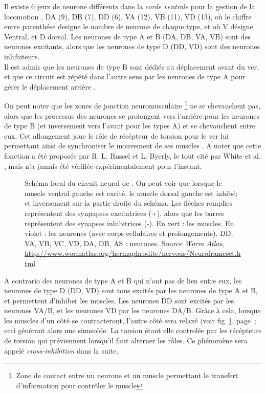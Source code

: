 Il existe 6 jeux de neurone différents dans la \textit{corde ventrale} pour la
gestion de la locomotion \cite{Boyle2009}, DA (9), DB (7), DD (6), VA (12), VB
(11), VD (13), où le chiffre entre parenthése designe le nombre de neurone de
chaque type, et où V désigne Ventral, et D dorsal.  Les neurones de type A et B
(DA, DB, VA, VB) sont des neurones excitants, alors que les neurones de type D
(DD, VD) sont des neurones inhibiteurs.\\


Il est admis que les neurones de type B sont dédiés au déplacement avant du ver,
et que ce circuit est répété dans l'autre sens par les neurones de type A
pour gérer le déplacement arrière \cite{AltunZ.F.andHall2011,Boyle2009,White1986}.

On peut noter que les zones de jonction neuromusculaire \footnote{Zone de
contact entre un neurone et un muscle permettant le transfert d'information 
pour contrôler le muscle} ne se chevauchent pas, alors que les processus
des neurones se prolongent vers l'arrière pour les neurones de type B (et
inversement vers l'avant pour les types A) et se chevauchent entre eux. Cet
allongement joue le rôle de récépteur de torsion pour le ver lui permettant
ainsi de synchroniser le mouvement de ses muscles \cite{Boyle2009}. A noter que
cette fonction a été proposée par R. L. Russel et L. Byerly, le tout cité par
White et al. \cite{White1986}, mais n'a jamais été vérifiée expérimentalement
pour l'instant.


\begin{figure}[ht]
   \begin{center}
   \end{center}
   \caption[Schéma local du circuit neural de \celeg{}]{Schéma local du circuit neural de \celeg{}. On peut voir
   que lorsque le muscle ventral gauche est excité, le muscle dorsal gauche est
   inhibé; et inversement sur la partie droite du schéma. Les flèches remplies
   représentent des synpapses excitatrices (+), alors que les barres représentent des
   synapses inhibitrices (-). En vert : les muscles. En violet : les neurones (avec corps cellulaires et prolongements).
   DD, VA, VB, VC, VD, DA, DB, AS : neurones. Source \textit{Worm Atlas},
   \url{http://www.wormatlas.org/hermaphrodite/nervous/Neuroframeset.html}}
   \label{fig:alternance_dv}
\end{figure}

A contrario des neurones de type A et B qui n'ont pas de lien entre eux, les
neurones de type D (DD, VD) sont tous excités par les neurones de type A et B,
et permettent d'inhiber les muscles. Les neurones DD sont excités par les
neurones VA/B, et les neurones VD par les neurones DA/B. Grâce à cela, lorsque
les muscles d'un côté se contracteront, l'autre côté sera relaxé (voir
fig~\ref{fig:alternance_dv}, page~\pageref{fig:alternance_dv}; ceci générant
alors une sinusoïde. La torsion étant elle controlée par les récépteurs de
torsion qui préviennent lorsqu'il faut alterner les rôles. Ce phénomène sera
appelé \textit{cross-inhibition} dans la suite.\\


